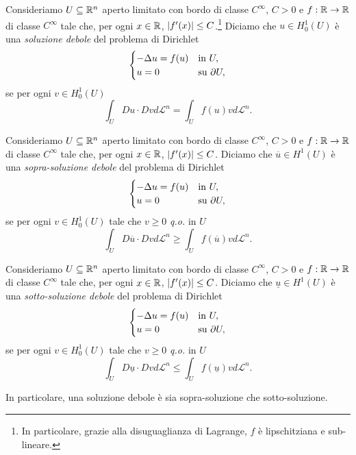 \begin{definizione}
	Consideriamo $U\subseteq \mathbb{R}^n$ aperto limitato con bordo di classe $C^\infty$, $C >0$ e $f: \mathbb{R} \to \mathbb{R}$ di classe $C^\infty$ tale che, per ogni $ x\in \mathbb{R}$, $\lvert f'(x)\rvert\le C$.\footnote{In particolare, grazie alla disuguaglianza di Lagrange, $f$ è lipschitziana e sub-lineare.}
	Diciamo che $u \in H^1_0(U)$ è una \emph{soluzione debole} del problema di Dirichlet
	\[ 	\begin{cases}
		-\Delta u = f(u) & \textup{in } U,\\
		u = 0 & \textup{su } \partial U,
	\end{cases} \]
	se per ogni $v \in H^1_0(U)$
	\[ \int_U Du \cdot Dv d\mathcal{L}^n = \int_U f(u)vd\mathcal{L}^n. \]
\end{definizione}
\begin{definizione}
Consideriamo $U\subseteq \mathbb{R}^n$ aperto limitato con bordo di classe $C^\infty$, $C >0$ e $f: \mathbb{R} \to \mathbb{R}$ di classe $C^\infty$ tale che, per ogni $ x\in \mathbb{R}$, $\lvert f'(x)\rvert\le C$. Diciamo che $\overline{u} \in H^1(U)$ è una \emph{sopra-soluzione debole} del problema di Dirichlet
\[ 	\begin{cases}
	-\Delta u = f(u) & \textup{in } U,\\
	u = 0 & \textup{su } \partial U,
\end{cases} \]
se per ogni $v \in H^1_0(U)$ tale che $v\ge 0$ \emph{q.o.} in $U$
\[ \int_U D\overline{u} \cdot Dv d\mathcal{L}^n \ge \int_U f(\overline{u})vd\mathcal{L}^n. \]
\end{definizione}
\begin{definizione}
	Consideriamo $U\subseteq \mathbb{R}^n$ aperto limitato con bordo di classe $C^\infty$, $C >0$ e $f: \mathbb{R} \to \mathbb{R}$ di classe $C^\infty$ tale che, per ogni $ x\in \mathbb{R}$, $\lvert f'(x)\rvert\le C$.
	Diciamo che $\underline{u} \in H^1(U)$ è una \emph{sotto-soluzione debole} del problema di Dirichlet
	\[ 	\begin{cases}
		-\Delta u = f(u) & \textup{in } U,\\
		u = 0 & \textup{su } \partial U,
	\end{cases} \]
	se per ogni $v \in H^1_0(U)$ tale che $v\ge 0$ \emph{q.o.} in $U$
	\[ \int_U D\underline{u} \cdot Dv d\mathcal{L}^n \le \int_U f(\underline{u})vd\mathcal{L}^n. \]
\end{definizione}
In particolare, una soluzione debole è sia sopra-soluzione che sotto-soluzione.

